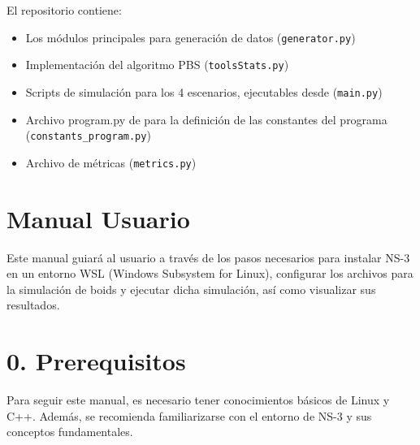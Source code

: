 \documentclass{article}
\begin{document}
El repositorio contiene:
\begin{itemize}
\item Los módulos principales para generación de datos (\texttt{generator.py})
\item Implementación del algoritmo PBS (\texttt{toolsStats.py})
\item Scripts de simulación para los 4 escenarios, ejecutables desde (\texttt{main.py})
\item Archivo program.py de para la definición de las constantes del programa 
    (\texttt{constants\_program.py})
\item Archivo de métricas (\texttt{metrics.py})
\end{itemize}

\section{Manual Usuario}\label{sec:man_u}

Este manual guiará al usuario a través de los pasos necesarios para instalar NS-3 en un entorno WSL (Windows Subsystem for Linux), configurar los archivos para la simulación de boids y ejecutar dicha simulación, así como visualizar sus resultados.

\section*{\textbf{0. Prerequisitos}}

Para seguir este manual, es necesario tener conocimientos básicos de Linux y C++. Además, se recomienda familiarizarse con el entorno de NS-3 y sus conceptos fundamentales.
\end{document}
